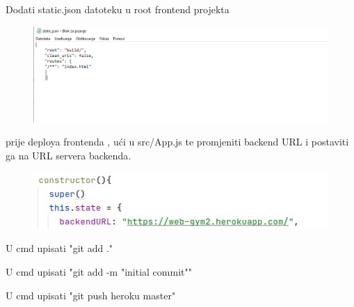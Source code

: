 \begin{packed_item}
\begin{packed_enum}
							\item Dodati static.json datoteku u root frontend projekta
							    
							    \begin{figure}[H]
                        			\hspace*{-1.5cm}
                        			\includegraphics[scale=0.5]{slike/json.PNG} %
                        			\centering
                        			\label{fig:promjene}
                        		\end{figure}
							
							\item prije deploya frontenda , ući u src/App.js te promjeniti backend URL i 
							postaviti ga na URL servera backenda.
							
							    \begin{figure}[H]
                        			\hspace*{-1.5cm}
                        			\includegraphics[scale=0.7]{slike/front.png} %
                        			\centering
                        			\label{fig:promjene}
                        		\end{figure}
							
							\item U cmd upisati "git add ."
							
							\item U cmd upisati "git add -m "initial commit""
							
							\item U cmd upisati "git push heroku master"
	

						\end{packed_enum}

				\end{packed_item}
				
			\eject 